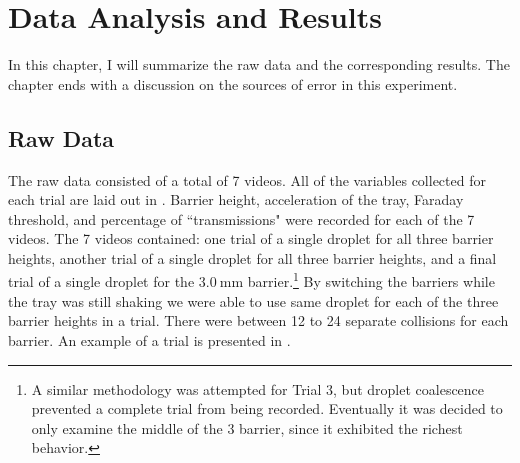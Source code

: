 \chapter{Data Analysis and Results}

In this chapter, I will summarize the raw data and the corresponding results. The chapter ends with a discussion on the sources of error in this experiment.

\section{Raw Data}



The raw data consisted of a total of 7 videos. All of the variables collected for each trial are laid out in . Barrier height, acceleration of the tray, Faraday threshold, and percentage of ``transmissions" were recorded for each of the 7 videos. The 7 videos contained: one trial of a single droplet for all three barrier heights, another trial of a single droplet for all three barrier heights, and a final trial of a single droplet for the $3.0~\mathrm{mm}$ barrier.\footnote{A similar methodology was attempted for Trial 3, but droplet coalescence prevented a complete trial from being recorded. Eventually it was decided to only examine the middle of the 3 barrier, since it exhibited the richest behavior.} By switching the barriers while the tray was still shaking we were able to use same droplet for each of the three barrier heights in a trial. There were between 12 to 24 separate collisions for each barrier. An example of a trial is presented in .

